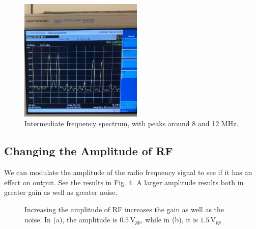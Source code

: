 \documentclass[lettersize,journal]{IEEEtran}
\begin{document}
\begin{figure}[!t]
\centering
\includegraphics[width=2.3in]{first}
\caption{Intermediate frequency spectrum, with peaks around 8 and 12 MHz.}
\label{fig_1}
\end{figure}

\subsection{Changing the Amplitude of RF}

We can modulate the amplitude of the radio frequency signal to see if it has an effect on output. See the results in Fig. 4. A larger amplitude results both in greater gain as well as greater noise.

\begin{figure}[!t]
\centering
{}
\hfil
{}
\caption{Increasing the amplitude of RF increases the gain as well as the noise. In (a), the amplitude is $0.5\,\text{V}_{pp}$, while in (b), it is $1.5\,\text{V}_{pp}$}
\label{fig_si}
\end{figure}
\end{document}
